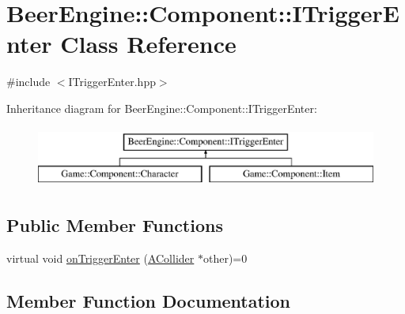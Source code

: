 \hypertarget{class_beer_engine_1_1_component_1_1_i_trigger_enter}{}\section{Beer\+Engine\+:\+:Component\+:\+:I\+Trigger\+Enter Class Reference}
\label{class_beer_engine_1_1_component_1_1_i_trigger_enter}


{\ttfamily \#include $<$I\+Trigger\+Enter.\+hpp$>$}

Inheritance diagram for Beer\+Engine\+:\+:Component\+:\+:I\+Trigger\+Enter\+:\begin{figure}[H]
\begin{center}
\leavevmode
\includegraphics[height=2.000000cm]{class_beer_engine_1_1_component_1_1_i_trigger_enter}
\end{center}
\end{figure}
\subsection*{Public Member Functions}
\begin{DoxyCompactItemize}
\item 
virtual void \mbox{\hyperlink{class_beer_engine_1_1_component_1_1_i_trigger_enter_aab0d007cc2a256bc5aa542cd7dfdeef0}{on\+Trigger\+Enter}} (\mbox{\hyperlink{class_beer_engine_1_1_component_1_1_a_collider}{A\+Collider}} $\ast$other)=0
\end{DoxyCompactItemize}


\subsection{Member Function Documentation}
\mbox{\label{class_beer_engine_1_1_component_1_1_i_trigger_enter_aab0d007cc2a256bc5aa542cd7dfdeef0}} 
